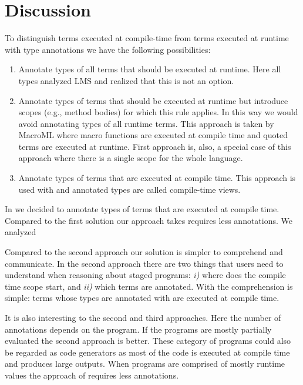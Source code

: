 \section{Discussion}
\label{sct:discussion}

To distinguish terms executed at compile-time from terms executed at runtime with type annotations we have the following possibilities:
\begin{enumerate}
\item Annotate types of all terms that should be executed at runtime. Here all types analyzed LMS and realized that this is not an option.


\item Annotate types of terms that should be executed at runtime but introduce scopes (e.g., method bodies) for which this rule applies.
In this way we would avoid annotating types of all runtime terms. This approach is taken by MacroML where
macro functions are executed at compile time and quoted terms are executed at runtime. First approach is, also,
a special case of this approach where there is a single scope for the whole language.

\item Annotate types of terms that are executed at compile time. This approach is used with \tool and annotated types are
called compile-time views.
\end{enumerate}

In \tool we decided to annotate types of terms that are executed at compile time. Compared to
the first solution our approach takes requires less annotations. We analyzed

Compared to the second approach our solution is simpler to comprehend and communicate. In the second approach there are
two things that users need to understand when reasoning about staged programs: \emph{i)} where does
the compile time scope start, and \emph{ii)} which terms are annotated. With \tool the comprehension
is simple: terms whose types are annotated with  are executed at compile time.

It is also interesting to the second and third approaches. Here the number of annotations
depends on the program. If the programs are mostly partially evaluated the second approach
is better. These category of programs could also be regarded as code generators as most of the code
is executed at compile time and produces large outputs. When programs are comprised of mostly
runtime values the approach of \tool requires less annotations.


